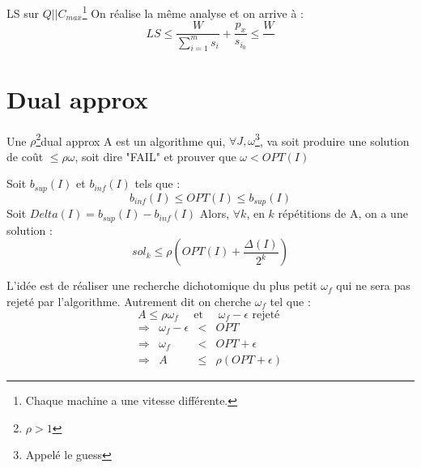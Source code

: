 \documentclass[a4paper, 11pt]{thesis}
\begin{document}
\begin{rmq}
    LS sur $Q| | C_{max}$\footnote{Chaque machine a une vitesse différente.}
    On réalise la même analyse et on arrive à : \begin{displaymath}
        LS \leq \frac{W}{\sum_{i=1}^m s_i} + \frac{p_x}{s_{i_0}} \leq \frac{W}{}
    \end{displaymath}
\end{rmq}

\section{Dual approx}

\begin{df}
    Une $\rho$\footnote{$\rho > 1$}dual approx A est un algorithme qui, $\forall J, \omega$\footnote{Appelé le
    guess}, va soit produire une solution de coût $\leq \rho \omega$, soit dire "FAIL" et prouver
    que $\omega < OPT(I)$
\end{df}

\begin{prop}
    Soit $b_{sup}(I)$ et $b_{inf}(I)$ tels que : \begin{displaymath}
        b_{inf}(I) \leq OPT(I) \leq b_{sup}(I)
    \end{displaymath}
    Soit $Delta(I) = b_{sup}(I) - b_{inf}(I)$
    Alors, $\forall k$, en $k$ répétitions de A, on a une solution : \begin{displaymath}
        sol_k \leq \rho(OPT(I) + \frac{\Delta(I)}{2^k})
    \end{displaymath}
\end{prop}

L'idée est de réaliser une recherche dichotomique du plus petit $\omega_f$ qui ne sera pas rejeté
par l'algorithme. Autrement dit on cherche $\omega_f$ tel que : 
\begin{displaymath}
    A \leq \rho \omega_f \quad \mbox{ et } \quad \omega_f - \epsilon \mbox{ rejeté }
\end{displaymath}
\begin{displaymath}
    \begin{array}{rrcl}
        \Rightarrow & \omega_f - \epsilon & < & OPT \\
        \Rightarrow & \omega_f & < & OPT + \epsilon \\
        \Rightarrow & A & \leq & \rho(OPT + \epsilon)
    \end{array}
\end{displaymath}
\end{document}
